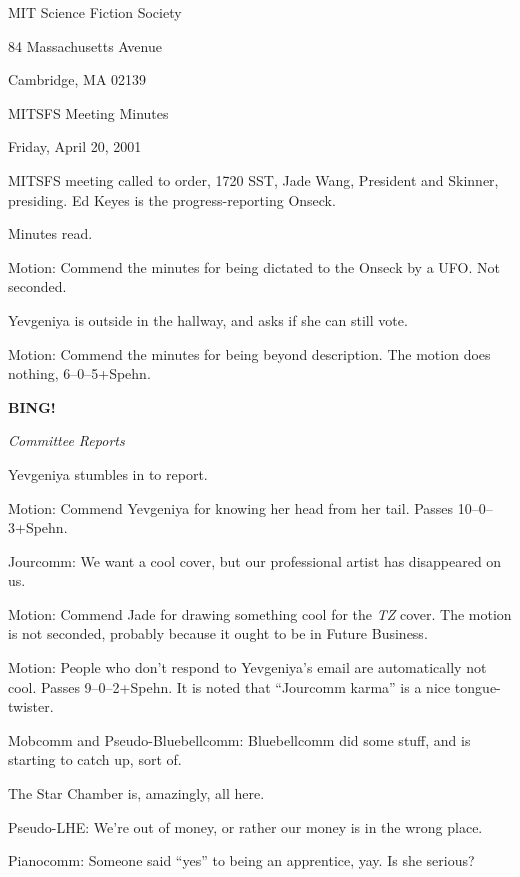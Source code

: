\documentclass[12pt]{article}
\newcommand{\bing}{{\bf BING!} }
\newcommand{\goto}[1]{\bing \vskip 12pt \centerline{{\em{#1}}}}
\begin{document}
\begin{center}

MIT Science Fiction Society 

84 Massachusetts Avenue

Cambridge, MA 02139

\vspace{12pt}

MITSFS Meeting Minutes 

Friday, April 20, 2001

\end{center}
 
\vspace{18pt}

\setlength{\parskip}{6pt}

\noindent
MITSFS meeting called to order, 1720 SST, Jade Wang, President and
Skinner, presiding.  Ed Keyes is the progress-reporting Onseck.

Minutes read.

Motion: Commend the minutes for being dictated to the Onseck by
a UFO.  Not seconded.

Yevgeniya is outside in the hallway, and asks if she can still vote.

Motion: Commend the minutes for being beyond description.  The motion
does nothing, 6--0--5+Spehn.

\goto{Committee Reports}

Yevgeniya stumbles in to report.

Motion: Commend Yevgeniya for knowing her head from her tail.
Passes 10--0--3+Spehn.

Jourcomm: We want a cool cover, but our professional artist has
disappeared on us.

Motion: Commend Jade for drawing something cool for the {\em TZ}
cover.  The motion is not seconded, probably because it ought to be
in Future Business.

Motion: People who don't respond to Yevgeniya's email are automatically
not cool.  Passes 9--0--2+Spehn.  It is noted that ``Jourcomm karma''
is a nice tongue-twister.

Mobcomm and Pseudo-Bluebellcomm: Bluebellcomm did some stuff, and is
starting to catch up, sort of.

The Star Chamber is, amazingly, all here.

Pseudo-LHE: We're out of money, or rather our money is in the wrong
place.

Pianocomm: Someone said ``yes'' to being an apprentice, yay.  Is she
serious?
\end{document}
